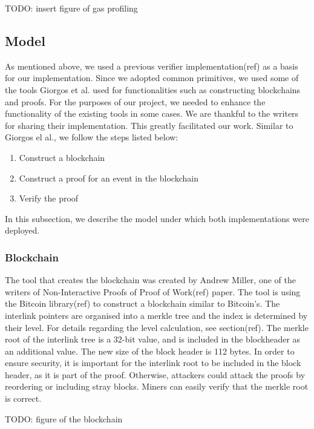 \documentclass{article}
\begin{document}
  TODO: insert figure of gas profiling

  \subsection{Model}

  As mentioned above, we used a previous verifier implementation(ref) as
  a basis for our implementation. Since we adopted common primitives, we
  used some of the tools Giorgos et al. used for functionalities such as
  constructing blockchains and proofs. For the purposes of our project,
  we needed to enhance the functionality of the existing tools in some
  cases. We are thankful to the writers for sharing their
  implementation. This greatly facilitated our work. Similar to Giorgos
  el al., we follow the steps listed below:

  \begin{enumerate}
  \item
    Construct a blockchain
  \item
    Construct a proof for an event in the blockchain
  \item
    Verify the proof
  \end{enumerate}

  In this subsection, we describe the model under which both
  implementations were deployed.

  \subsubsection{Blockchain}

  The tool that creates the blockchain was created by Andrew Miller, one
  of the writers of Non-Interactive Proofs of Proof of Work(ref) paper.
  The tool is using the Bitcoin library(ref) to construct a blockchain
  similar to Bitcoin’s. The interlink pointers are organised into a
  merkle tree and the index is determined by their level. For details
  regarding the level calculation, see section(ref). The merkle root of
  the interlink tree is a 32-bit value, and is included in the
  blockheader as an additional value. The new size of the block header
  is 112 bytes. In order to ensure security, it is important for the
  interlink root to be included in the block header, as it is part of
  the proof. Otherwise, attackers could attack the proofs by reordering
  or including stray blocks. Miners can easily verify that the merkle
  root is correct.

  TODO: figure of the blockchain
\end{document}
